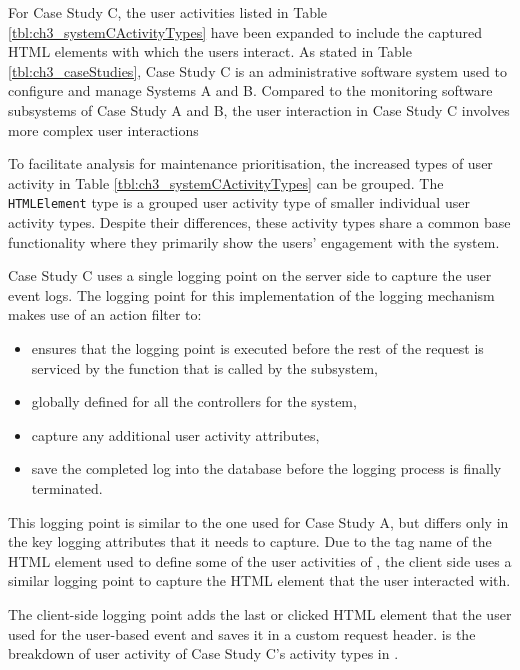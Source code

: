 For Case Study C, the user activities listed in Table \ref{tbl:ch3_systemCActivityTypes} have been expanded to include the captured HTML elements with which the users interact. As stated in Table \ref{tbl:ch3_caseStudies}, Case Study C is an administrative software system used to configure and manage Systems A and B. Compared to the monitoring software subsystems of Case Study A and B, the user interaction in Case Study C involves more complex user interactions\par To facilitate analysis for maintenance prioritisation, the increased types of user activity in Table \ref{tbl:ch3_systemCActivityTypes} can be grouped. The \texttt{HTMLElement} type is a grouped user activity type of smaller individual user activity types. Despite their differences, these activity types share a common base functionality where they primarily show the users' engagement with the system.\par Case Study C uses a single logging point on the server side to capture the user event logs. The logging point for this implementation of the logging mechanism makes use of an action filter to:

\begin{itemize}
	\item ensures that the logging point is executed before the rest of the request is serviced by the function that is called by the subsystem,
	\item globally defined for all the controllers for the system,
	\item capture any additional user activity attributes,
	\item save the completed log into the database before the logging process is finally terminated.
\end{itemize}

This logging point is similar to the one used for Case Study A, but differs only in the key logging attributes that it needs to capture. Due to the tag name of the HTML element used to define some of the user activities of , the client side uses a similar logging point to capture the HTML element that the user interacted with.\par The client-side logging point adds the last or clicked HTML element that the user used for the user-based event and saves it in a custom request header.  is the breakdown of user activity of Case Study C's activity types in .

